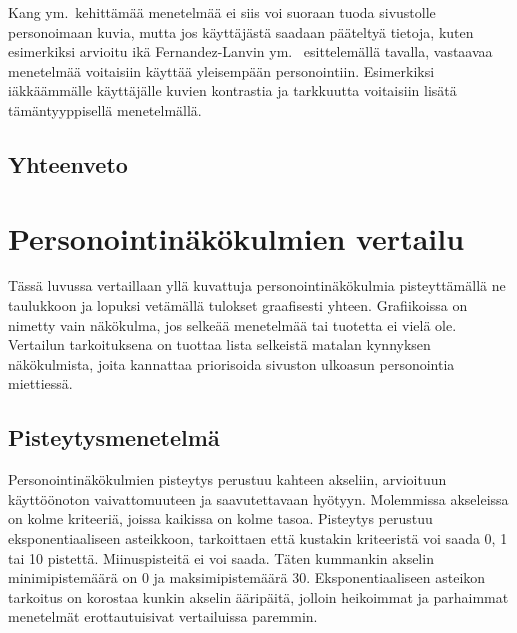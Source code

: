 \documentclass[finnish, 12pt, a4paper, elec, utf8, a-1b, online]{aaltothesis}
\begin{document}
Kang ym.~kehittämää menetelmää ei siis voi suoraan tuoda sivustolle
personoimaan kuvia, mutta jos käyttäjästä saadaan pääteltyä tietoja, kuten
esimerkiksi arvioitu ikä Fernandez-Lanvin ym.~\cite{fernandez2018dimension}
esittelemällä tavalla, vastaavaa menetelmää voitaisiin käyttää yleisempään
personointiin. Esimerkiksi iäkkäämmälle käyttäjälle kuvien kontrastia ja
tarkkuutta voitaisiin lisätä tämäntyyppisellä menetelmällä.

\subsection{Yhteenveto}

\clearpage

\section{Personointinäkökulmien vertailu}\label{personalization-comparison}

Tässä luvussa vertaillaan yllä kuvattuja personointinäkökulmia pisteyttämällä ne
taulukkoon ja lopuksi vetämällä tulokset graafisesti yhteen. Grafiikoissa on
nimetty vain näkökulma, jos selkeää menetelmää tai tuotetta ei vielä ole.
Vertailun tarkoituksena on tuottaa lista selkeistä matalan kynnyksen
näkökulmista, joita kannattaa priorisoida sivuston ulkoasun personointia
miettiessä.

\subsection{Pisteytysmenetelmä}

Personointinäkökulmien pisteytys perustuu kahteen akseliin, arvioituun
käyttöönoton vaivattomuuteen ja saavutettavaan hyötyyn. Molemmissa akseleissa on
kolme kriteeriä, joissa kaikissa on kolme tasoa. Pisteytys perustuu
eksponentiaaliseen asteikkoon, tarkoittaen että kustakin kriteeristä voi saada
0, 1 tai 10 pistettä. Miinuspisteitä ei voi saada. Täten kummankin akselin
minimipistemäärä on 0 ja maksimipistemäärä 30. Eksponentiaaliseen asteikon
tarkoitus on korostaa kunkin akselin ääripäitä, jolloin heikoimmat ja parhaimmat
menetelmät erottautuisivat vertailuissa paremmin.
\end{document}
